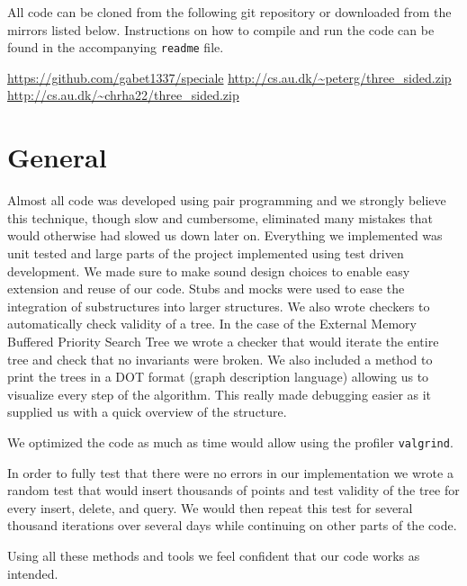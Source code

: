 \documentclass[twoside,11pt,openright]{report}
\begin{document}
All code can be cloned from the following git repository or downloaded from the mirrors listed below. Instructions on how to compile and run the code can be found in the accompanying \texttt{readme} file.

\begin{center}
\url{https://github.com/gabet1337/speciale}
\url{http://cs.au.dk/~peterg/three_sided.zip}
\url{http://cs.au.dk/~chrha22/three_sided.zip}
\end{center}

\section{General}
Almost all code was developed using pair programming and we strongly believe this technique, though slow and cumbersome, eliminated many mistakes that would otherwise had slowed us down later on.
Everything we implemented was unit tested and large parts of the project implemented using test driven development. We made sure to make sound design choices to enable easy extension and reuse of our code. Stubs and mocks were used to ease the integration of substructures into larger structures.
We also wrote checkers to automatically check validity of a tree. In the case of the External Memory Buffered Priority Search Tree we wrote a checker that would iterate the entire tree and check that no invariants were broken. We also included a method to print the trees in a DOT format (graph description language) allowing us to visualize every step of the algorithm. This really made debugging easier as it supplied us with a quick overview of the structure.

We optimized the code as much as time would allow using the profiler \texttt{valgrind}.

In order to fully test that there were no errors in our implementation we wrote a random test that would insert thousands of points and test validity of the tree for every insert, delete, and query. We would then repeat this test for several thousand iterations over several days while continuing on other parts of the code.

Using all these methods and tools we feel confident that our code works as intended.
\end{document}
